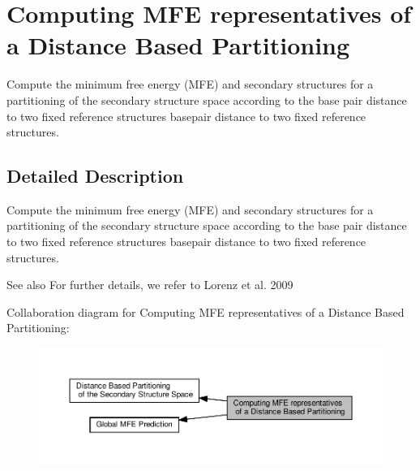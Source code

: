 \hypertarget{group__kl__neighborhood__mfe}{}\section{Computing M\+FE representatives of a Distance Based Partitioning}
\label{group__kl__neighborhood__mfe}


Compute the minimum free energy (M\+FE) and secondary structures for a partitioning of the secondary structure space according to the base pair distance to two fixed reference structures basepair distance to two fixed reference structures.  




\subsection{Detailed Description}
Compute the minimum free energy (M\+FE) and secondary structures for a partitioning of the secondary structure space according to the base pair distance to two fixed reference structures basepair distance to two fixed reference structures. 

\begin{DoxySeeAlso}{See also}
For further details, we refer to Lorenz et al. 2009 \cite{lorenz:2009} 
\end{DoxySeeAlso}
Collaboration diagram for Computing M\+FE representatives of a Distance Based Partitioning\+:
\nopagebreak
\begin{figure}[H]
\begin{center}
\leavevmode
\includegraphics[width=350pt]{group__kl__neighborhood__mfe}
\end{center}
\end{figure}
